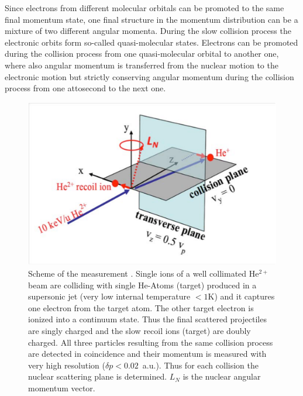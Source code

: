 \documentclass[12pt]{article}
\begin{document}
Since electrons from different molecular orbitals can be promoted to the same final momentum state, one final structure in the momentum distribution can be a mixture of two different angular momenta. During the slow collision process the electronic orbits form so-called quasi-molecular states. Electrons can be promoted during the collision process from one quasi-molecular orbital to another one, where also angular momentum is transferred from the nuclear motion to the electronic motion but strictly conserving angular momentum during the collision process from one attosecond to the next one. 
%
\begin{figure}
\begin{center}
\includegraphics[scale=0.4]{figures/HeExp_scheme}
\caption{Scheme of the measurement \citep{SchmidtLEtal2014Vortices}. Single ions of a well collimated He$^{2+}$ beam are colliding  with single He-Atoms (target) produced in a supersonic jet (very low internal temperature $< 1$K) and it captures one electron from the target atom. The other target electron is ionized into a continuum state. Thus the final scattered projectiles are singly charged and the slow recoil ions (target) are doubly charged. All three particles resulting from the same collision process are detected in coincidence and their momentum is measured with very high resolution ($\delta p<0.02$~a.u.). Thus for each collision the nuclear scattering plane is  determined. $L_{N}$  is the nuclear angular momentum vector. }
\label{fig:HeExp_scheme}
\end{center}
\end{figure}
%
%
\end{document}
